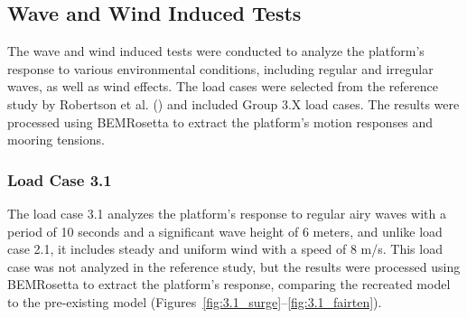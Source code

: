 \documentclass[a4paper, 11pt]{article}
\begin{document}
\subsection{Wave and Wind Induced Tests}
\hspace*{0.5cm}The wave and wind induced tests were conducted to analyze the platform's response to various environmental conditions, including regular and irregular waves, as well as wind effects. The load cases were selected from the reference study by Robertson et al. (\cite{Robertson2014}) and included Group 3.X load cases. The results were processed using BEMRosetta to extract the platform's motion responses and mooring tensions.

\subsubsection{Load Case 3.1}
\hspace*{0.5cm}The load case 3.1 analyzes the platform’s response to regular airy waves with a period of 10 seconds and a significant wave height of 6 meters, and unlike load case 2.1, it includes steady and uniform wind with a speed of 8 m/s. This load case was not analyzed in the reference study, but the results were processed using BEMRosetta to extract the platform’s response, comparing the recreated model to the pre-existing model (Figures~\ref{fig:3.1_surge}--\ref{fig:3.1_fairten}).
\end{document}
